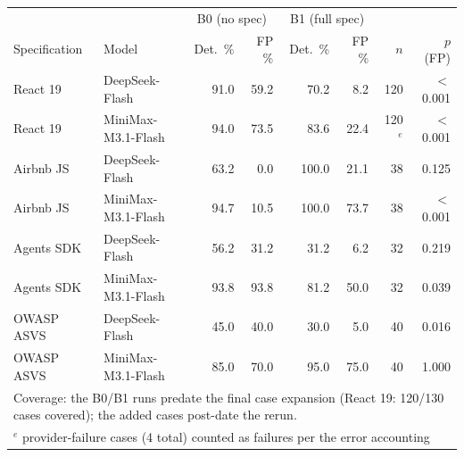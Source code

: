 \begin{tabular}{llrrrrrr}
\toprule
 & & \multicolumn{2}{c}{B0 (no spec)} & \multicolumn{2}{c}{B1 (full spec)} & & \\
Specification & Model & Det.\ \% & FP \% & Det.\ \% & FP \% & $n$ & $p$ (FP) \\
\midrule
React 19 & DeepSeek-Flash & 91.0 & 59.2 & 70.2 & 8.2 & 120 & $<$0.001 \\
React 19 & MiniMax-M3.1-Flash & 94.0 & 73.5 & 83.6 & 22.4 & 120$^{e}$ & $<$0.001 \\
\addlinespace
Airbnb JS & DeepSeek-Flash & 63.2 & 0.0 & 100.0 & 21.1 & 38 & 0.125 \\
Airbnb JS & MiniMax-M3.1-Flash & 94.7 & 10.5 & 100.0 & 73.7 & 38 & $<$0.001 \\
\addlinespace
Agents SDK & DeepSeek-Flash & 56.2 & 31.2 & 31.2 & 6.2 & 32 & 0.219 \\
Agents SDK & MiniMax-M3.1-Flash & 93.8 & 93.8 & 81.2 & 50.0 & 32 & 0.039 \\
\addlinespace
OWASP ASVS & DeepSeek-Flash & 45.0 & 40.0 & 30.0 & 5.0 & 40 & 0.016 \\
OWASP ASVS & MiniMax-M3.1-Flash & 85.0 & 70.0 & 95.0 & 75.0 & 40 & 1.000 \\
\multicolumn{8}{l}{\footnotesize Coverage: the B0/B1 runs predate the final case expansion (React 19: 120/130 cases covered); the added cases post-date the rerun.} \\
\multicolumn{8}{l}{\footnotesize $^{e}$ provider-failure cases (4 total) counted as failures per the error accounting} \\
\bottomrule
\end{tabular}

